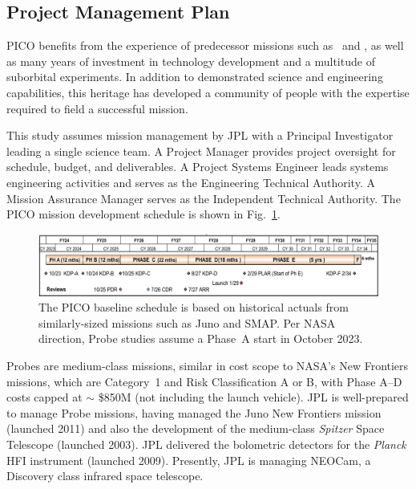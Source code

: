 \subsection{Project Management Plan}
\label{sec:management_plan} %

PICO benefits from the experience of predecessor missions such as \planck\ and \wmap, as well as many years of investment in technology development and a multitude of suborbital experiments. In addition to demonstrated science and engineering capabilities, this heritage has developed a community of people with the expertise required to field a successful mission.

This study assumes mission management by JPL with a Principal Investigator leading a single science team. A Project Manager provides project oversight for schedule, budget, and deliverables. A Project Systems Engineer leads systems engineering activities and serves as the Engineering Technical Authority. A Mission Assurance Manager serves as the Independent Technical Authority. The PICO mission development schedule is shown in Fig.~\ref{fig:Schedule}.

\begin{figure}[hb]
\begin{center}
\includegraphics[width=\textwidth]{figures/Schedule.png}
\end{center}
\vspace{-0.25in}
\caption{\captiontext The PICO baseline schedule is based on historical actuals from similarly-sized missions such as Juno and SMAP. Per NASA direction, Probe studies assume a Phase~A start in October 2023.\label{fig:Schedule}}
\vspace{-0.05in}
\end{figure}

Probes are medium-class missions, similar in cost scope to NASA's
New Frontiers missions, which are Category~1 and Risk Classification A
or B, with Phase A--D costs capped at $\sim$ \$850M (not including the
launch vehicle). JPL is well-prepared to manage Probe missions, having
managed the Juno New Frontiers mission (launched 2011) and also the
development of the medium-class \textit{Spitzer} Space Telescope (launched
2003). JPL delivered the bolometric detectors for the \textit{Planck}
HFI instrument (launched 2009). Presently, JPL is managing NEOCam, a
Discovery class infrared space telescope.

